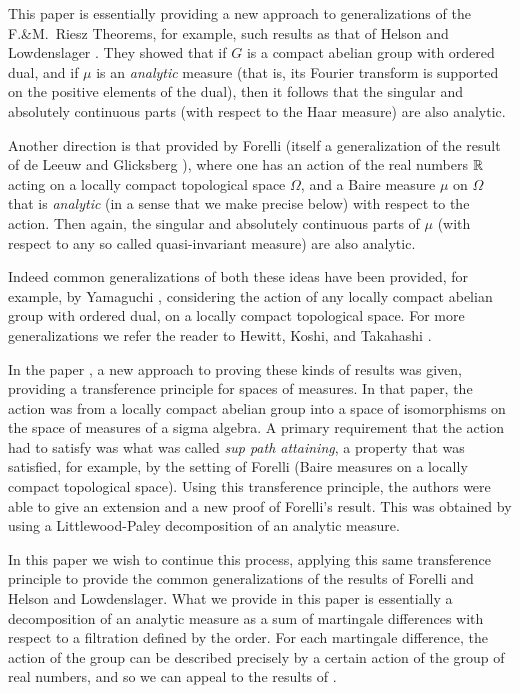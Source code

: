 \documentclass[12pt,leqno]{article}
\def\R{\Bbb R}
\begin{document}
This paper is essentially providing a new approach to generalizations of 
the F.\&M.~Riesz Theorems, for example, such results as that  
of Helson and Lowdenslager \cite{hl1, hl2}.  They showed that if 
$G$ is a compact abelian group with ordered dual, and if $\mu$ is an
{\em analytic\/} measure (that is, its Fourier transform is supported
on the positive elements of the dual), then it follows that the singular
and absolutely continuous parts (with respect to the Haar measure) are also
analytic.

Another direction is that provided by Forelli \cite{forelli}
(itself a generalization of the result of 
de Leeuw and Glicksberg \cite{deleeuwglicksberg}), 
where one has an
action of the real numbers $\R$ acting on a locally compact topological
space $\Omega$, and a Baire measure $\mu$ on $\Omega$ that is {\em analytic\/}
(in a sense that we make precise below) with respect to the action.  Then
again, the singular and absolutely continuous parts of $\mu$ (with respect
to any so called quasi-invariant measure) are also analytic.

Indeed common generalizations of both these ideas have been provided, for
example, by Yamaguchi \cite{yama}, considering the action of any locally
compact abelian group with ordered dual, on a locally compact topological
space.  For more generalizations we refer the reader to
 Hewitt, Koshi, and Takahashi \cite{hkt}.

In the paper \cite{amss}, a new approach to proving these kinds of results
was given, providing a transference principle for spaces of measures.  In
that paper, the action was from a locally compact abelian group into a
space of isomorphisms on the space of measures of a sigma algebra.  
A primary requirement that the action had to satisfy was what was called
{\em sup path attaining}, a property that was satisfied, for example, by
the setting of Forelli (Baire measures on a locally compact topological 
space).  Using this transference principle, the authors were able to 
give an extension and a new proof of Forelli's result.  This was obtained
by using a Littlewood-Paley decomposition of an analytic measure.

In this paper we wish to continue this process, applying this same 
transference principle to provide the common generalizations of the
results of Forelli and Helson and Lowdenslager.  What we provide in
this paper is essentially a decomposition of an analytic measure as 
a sum of martingale differences with respect to
a filtration defined by the order.  For each martingale difference, the
action of the group can be described precisely by a certain action of the
group of real numbers, and so we can appeal to the results of \cite{amss}.
\end{document}
